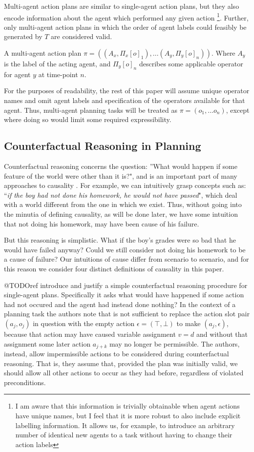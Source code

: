 \documentclass{article}
\theoremstyle{plain}
\theoremstyle{definition}
\begin{document}
Multi-agent action plans are similar to single-agent action plans, but they also encode information about the agent which performed any given action \footnote{I am aware that this information is trivially obtainable when agent actions have unique names, but I feel that it is more robust to also include explicit labelling information. It allows us, for example, to introduce an arbitrary number of identical new agents to a task without having to change their action labels}. Further, only multi-agent action plans in which the order of agent labels could feasibly be generated by $T$ are considered valid.

A multi-agent action plan $\pi=((A_x, \Pi_x[o]_1),...(A_y, \Pi_y[o]_n))$. Where $A_y$ is the label of the acting agent, and $\Pi_y[o]_n$ describes some applicable operator for agent $y$ at time-point $n$.

For the purposes of readability, the rest of this paper will assume unique operator names and omit agent labels and specification of the operators available for that agent. Thus, multi-agent planning tasks will be treated as $\pi=(o_1,...o_n)$, except where doing so would limit some required expressibility. 

\subsection{Counterfactual Reasoning in Planning}

Counterfactual reasoning concerns the question: ''What would happen if some feature of the world were other than it is?", and is an important part of many approaches to causality \cite{halpern2005causes}. For example, we can intuitively grasp concepts such as: ``\textit{if the boy had not done his homework, he would not have passed}", which deal with a world different from the one in which we exist. Thus, without going into the minutia of defining causality, as will be done later, we have some intuition that not doing his homework, may have been cause of his failure.

But this reasoning is simplistic. What if the boy's grades were so bad that he would have failed anyway? Could we still consider not doing his homework to be a cause of failure? Our intuitions of cause differ from scenario to scenario, and for this reason we consider four distinct definitions of causality in this paper.

@TODOref introduce and justify a simple counterfactual reasoning procedure for single-agent plans. Specifically it asks what would have happened if some action had not occured and the agent had instead done nothing? In the context of a planning task the authors note that is not sufficient to replace the action slot pair $(a_j, o_j)$ in question with the empty action $\epsilon=(\top, \bot)$ to make $(a_j, \epsilon)$, because that action may have caused variable assignment $v=d$ and without that assignment some later action $a_{j+k}$ may no longer be permissible. The authors, instead, allow impermissible actions to be considered during counterfactual reasoning. That is, they assume that, provided the plan was initially valid, we should allow all other actions to occur as they had before, regardless of violated preconditions.
\end{document}
